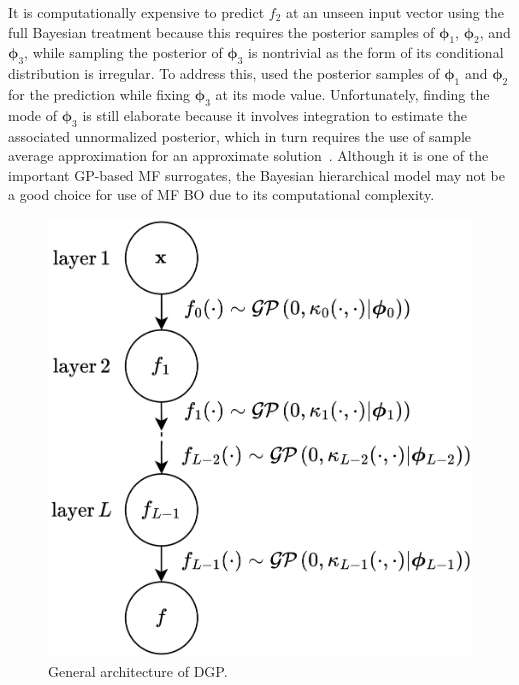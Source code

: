 \documentclass[iicol,sn-basic]{sn-jnl}%
\begin{document}
It is computationally expensive to predict $f_2$ at an unseen input vector using the full Bayesian treatment because this requires the posterior samples of ${\boldsymbol \phi}_1$, ${\boldsymbol \phi}_2$, and ${\boldsymbol \phi}_3$, while sampling the posterior of ${\boldsymbol \phi}_3$ is nontrivial as the form of its conditional distribution is irregular.
To address this, \cite{Qian2008} used the posterior samples of ${\boldsymbol \phi}_1$ and ${\boldsymbol \phi}_2$ for the prediction while fixing ${\boldsymbol \phi}_3$ at its mode value.
Unfortunately, finding the mode of ${\boldsymbol \phi}_3$ is still elaborate because it involves integration to estimate the associated unnormalized posterior, which in turn requires the use of sample average approximation for an approximate solution~\citep{Verweij2003}.
Although it is one of the important GP-based MF surrogates, the Bayesian hierarchical model may not be a good choice for use of MF BO due to its computational complexity.

\begin{figure}
	\centering
	\includegraphics[scale=0.8]{Fig5.png}
	\caption{General architecture of DGP.}
	\label{Fig5}
\end{figure}
\end{document}
